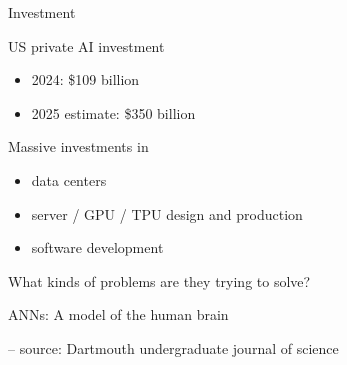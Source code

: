 \begin{frame}{Investment}

    US private AI investment 

    \begin{itemize}
        \item 2024: \$109 billion 
        \vspace{0.5em}
        \item 2025 estimate: \$350 billion 
    \end{itemize}

        \vspace{0.5em}
        \vspace{0.5em}
        \vspace{0.5em}
    Massive investments in 

    \begin{itemize}
        \item data centers
        \vspace{0.5em}
        \item server / GPU / TPU design and production
        \vspace{0.5em}
        \item software development
    \end{itemize}

\end{frame}


\begin{frame}
    
    What kinds of problems are they trying to solve?

\end{frame}



\begin{frame}{ANNs: A model of the human brain}
    
    \begin{figure}
       \centering
    \end{figure}

    \footnotesize{
    \hspace{5em} -- source: Dartmouth undergraduate journal of science}

\end{frame}



